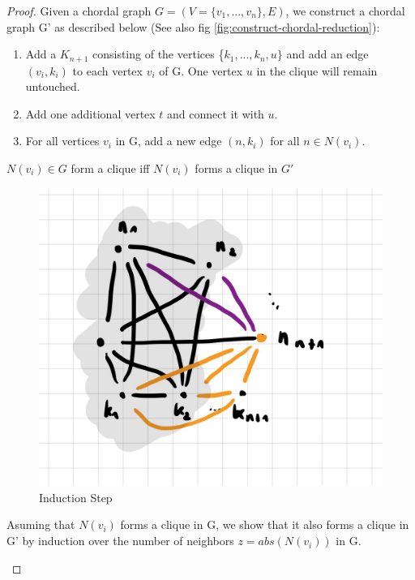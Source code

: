 \begin{proof}
    

    Given a chordal graph $G = (V = \{v_1,...,v_n\}, E)$, we construct a chordal graph G' as described below (See also fig \ref{fig:construct-chordal-reduction}):
    \begin{enumerate}
        \item Add a $K_{n+1}$ consisting of the vertices \{$k_1,...,k_n,u\}$ and add an edge $(v_i, k_i)$ to each vertex $v_i$ of G. One vertex $u$ in the clique will remain untouched.
        \item Add one additional vertex $t$ and connect it with $u$.
        \item For all vertices $v_i$ in G, add a new edge $(n, k_i)$ for all $n \in N(v_i)$.
    \end{enumerate}



    \begin{corollary}\label{cliqueNeighbor}
       $N(v_i) \in G$ form a clique iff $N(v_i)$ forms a clique in $G'$
    \end{corollary}

    \begin{subproof}

\begin{figure}[th]
    \includegraphics[scale=0.15]{pages/img/induction-step.jpg}
    \centering
    \caption{Induction Step}
    \label{fig:induction-step}
\end{figure}
        Asuming that $N(v_i)$ forms a clique in G, we show that it also forms a clique in G' by induction over the number of neighbors $z = abs(N(v_i))$ in G.


\end{subproof}
\end{proof}
